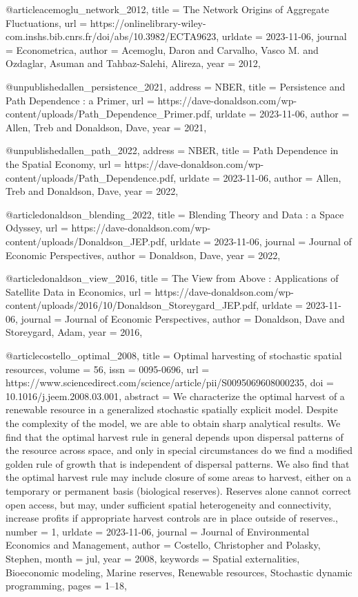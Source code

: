 @article{acemoglu_network_2012,
	title = {The {Network} {Origins} of {Aggregate} {Fluctuations}},
	url = {https://onlinelibrary-wiley-com.inshs.bib.cnrs.fr/doi/abs/10.3982/ECTA9623},
	urldate = {2023-11-06},
	journal = {Econometrica},
	author = {Acemoglu, Daron and Carvalho, Vasco M. and Ozdaglar, Asuman and Tahbaz-Salehi, Alireza},
	year = {2012},
}

@unpublished{allen_persistence_2021,
	address = {NBER},
	title = {Persistence and {Path} {Dependence} : a {Primer}},
	url = {https://dave-donaldson.com/wp-content/uploads/Path_Dependence_Primer.pdf},
	urldate = {2023-11-06},
	author = {Allen, Treb and Donaldson, Dave},
	year = {2021},
}

@unpublished{allen_path_2022,
	address = {NBER},
	title = {Path {Dependence} in the {Spatial} {Economy}},
	url = {https://dave-donaldson.com/wp-content/uploads/Path_Dependence.pdf},
	urldate = {2023-11-06},
	author = {Allen, Treb and Donaldson, Dave},
	year = {2022},
}

@article{donaldson_blending_2022,
	title = {Blending {Theory} and {Data} : a {Space} {Odyssey}},
	url = {https://dave-donaldson.com/wp-content/uploads/Donaldson_JEP.pdf},
	urldate = {2023-11-06},
	journal = {Journal of Economic Perspectives},
	author = {Donaldson, Dave},
	year = {2022},
}

@article{donaldson_view_2016,
	title = {The {View} from {Above} : {Applications} of {Satellite} {Data} in {Economics}},
	url = {https://dave-donaldson.com/wp-content/uploads/2016/10/Donaldson_Storeygard_JEP.pdf},
	urldate = {2023-11-06},
	journal = {Journal of Economic Perspectives},
	author = {Donaldson, Dave and Storeygard, Adam},
	year = {2016},
}



@article{costello_optimal_2008,
	title = {Optimal harvesting of stochastic spatial resources},
	volume = {56},
	issn = {0095-0696},
	url = {https://www.sciencedirect.com/science/article/pii/S0095069608000235},
	doi = {10.1016/j.jeem.2008.03.001},
	abstract = {We characterize the optimal harvest of a renewable resource in a generalized stochastic spatially explicit model. Despite the complexity of the model, we are able to obtain sharp analytical results. We find that the optimal harvest rule in general depends upon dispersal patterns of the resource across space, and only in special circumstances do we find a modified golden rule of growth that is independent of dispersal patterns. We also find that the optimal harvest rule may include closure of some areas to harvest, either on a temporary or permanent basis (biological reserves). Reserves alone cannot correct open access, but may, under sufficient spatial heterogeneity and connectivity, increase profits if appropriate harvest controls are in place outside of reserves.},
	number = {1},
	urldate = {2023-11-06},
	journal = {Journal of Environmental Economics and Management},
	author = {Costello, Christopher and Polasky, Stephen},
	month = jul,
	year = {2008},
	keywords = {Spatial externalities, Bioeconomic modeling, Marine reserves, Renewable resources, Stochastic dynamic programming},
	pages = {1--18},
}

